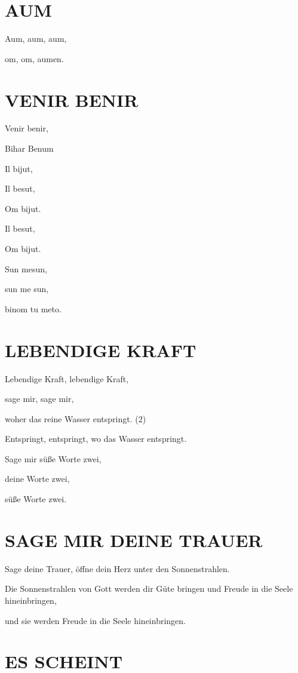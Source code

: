 \documentclass[11pt,a5paper,twoside]{article}
\begin{document}
\section[Aum]{AUM}

Aum, aum, aum, 

om, om, aumen.

\section[Venir Benir]{VENIR BENIR}

Venir benir, 

Bihar Benum 

Il bijut,

Il besut, 

Om bijut. 

Il besut, 

Om bijut. 

Sun mesun, 

sun me sun, 

binom tu meto. 

\section[Lebendige Kraft]{LEBENDIGE KRAFT}

Lebendige Kraft, lebendige Kraft,

sage mir, sage mir,

woher das reine Wasser entspringt. (2)

Entspringt, entspringt, wo das Wasser entspringt.

Sage mir süße Worte zwei,

deine Worte zwei, 

süße Worte zwei.

\section[Sage mir deine Trauer]{SAGE MIR DEINE TRAUER}

Sage deine Trauer, öffne dein Herz unter den Sonnenstrahlen.

Die Sonnenstrahlen von Gott werden dir Güte bringen und Freude in die Seele hineinbringen,

und sie werden Freude in die Seele hineinbringen.

\section[Es scheint]{ES SCHEINT}
\end{document}

